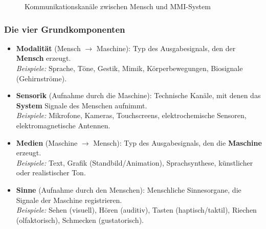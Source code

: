 \documentclass[12pt, a4paper]{article}
\begin{document}
\begin{figure}[H]
\centering
{}
\caption{Kommunikationskanäle zwischen Mensch und MMI-System}
\end{figure}

\subsubsection{Die vier Grundkomponenten}

\begin{itemize}
  \item \textbf{Modalität} (Mensch $\rightarrow$ Maschine): Typ des Ausgabesignals,
        den der \textbf{Mensch} erzeugt.\\
        \textit{Beispiele:} Sprache, Töne, Gestik, Mimik, Körperbewegungen,
        Biosignale (Gehirnströme).

  \item \textbf{Sensorik} (Aufnahme durch die Maschine): Technische Kanäle, mit
        denen das \textbf{System} Signale des Menschen aufnimmt.\\
        \textit{Beispiele:} Mikrofone, Kameras, Touchscreens, elektrochemische
        Sensoren, elektromagnetische Antennen.

  \item \textbf{Medien} (Maschine $\rightarrow$ Mensch): Typ des Ausgabesignals,
        den die \textbf{Maschine} erzeugt.\\
        \textit{Beispiele:} Text, Grafik (Standbild/Animation), Sprachsynthese,
        künstlicher oder realistischer Ton.

  \item \textbf{Sinne} (Aufnahme durch den Menschen): Menschliche Sinnesorgane,
        die Signale der Maschine registrieren.\\
        \textit{Beispiele:} Sehen (visuell), Hören (auditiv), Tasten
        (haptisch/taktil), Riechen (olfaktorisch), Schmecken (gustatorisch).
\end{itemize}
\end{document}
